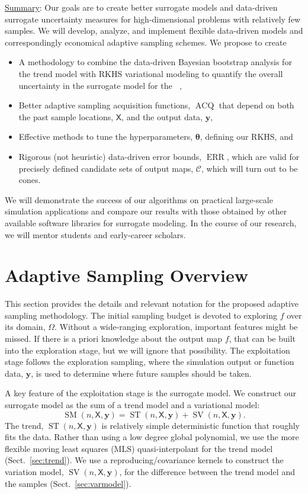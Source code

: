 \documentclass[11pt]{NSFamsart}
\newcommand{\Upara}[1]{\noindent\underline{\upshape #1}:}
\DeclareMathOperator{\QOI}{QOI} %
\DeclareMathOperator{\APP}{\widehat{\QOI}}
\DeclareMathOperator{\SURR}{SM} %
\DeclareMathOperator{\STREND}{ST} %
\DeclareMathOperator{\SVAR}{SV} %
\DeclareMathOperator{\ERR}{ERR}
\DeclareMathOperator{\VAL}{ACQ}
\newcommand{\mX}{\mathsf{X}}
\newcommand{\by}{{\boldsymbol{y}}}
\newcommand{\btheta}{{\boldsymbol{\theta}}}
\newcommand{\calc}{{\mathcal{C}}}
\begin{document}
\Upara{Summary} 
Our goals are to create better surrogate models and data-driven surrogate uncertainty measures for high-dimensional problems with relatively few samples. We will develop, analyze, and implement flexible data-driven models and correspondingly economical adaptive sampling schemes. We propose to create
\begin{itemize}
\item A methodology to combine the data-driven Bayesian bootstrap analysis for the trend model with RKHS variational modeling to quantify the overall uncertainty in the surrogate model for the $\APP$,
\item Better adaptive sampling acquisition functions, $\VAL$ that depend on both the past sample locations, $\mX$, and the output data, $\by$, 
\item Effective methods to tune the hyperparameters, $\btheta$, defining our RKHS, and
\item Rigorous (not heuristic) data-driven error bounds, $\ERR$, which are valid for precisely defined candidate sets of output maps, $\calc$, which will turn out to be cones.
\end{itemize}
We will demonstrate the success of our algorithms on practical large-scale simulation applications and compare our results with those obtained by other available software libraries for surrogate modeling. In the course of our research, we will mentor students and early-career scholars. 

\section{Adaptive Sampling Overview} \label{sec:overview}
This section provides the details and relevant notation for the proposed adaptive sampling methodology. The initial sampling budget is devoted to exploring $f$ over its domain, $\Omega$. Without a wide-ranging exploration, important features might be missed. If there is a priori knowledge about the output map $f$, that can be built into the exploration stage, but we will ignore that possibility. The exploitation stage follows the exploration sampling, where the simulation output or function data, $\by$, is used to determine where future samples should be taken.

A key feature of the exploitation stage is the surrogate model. We construct our surrogate model as the sum of a trend model and a variational model: 
\begin{equation*}
\SURR(n,\mX,\by) = \STREND(n,\mX,\by) + \SVAR(n,\mX,\by). 
\end{equation*} 
The trend, $\STREND(n,\mX,\by)$ is relatively simple deterministic function that roughly fits the data. Rather than using a low degree global polynomial, we use the more flexible moving least squares (MLS) quasi-interpolant for the trend model (Sect.\ \ref{sec:trend}). We use a reproducing/covariance kernels to construct the variation model, $\SVAR(n,\mX,\by)$, for the difference between the trend model and the samples (Sect.\ \ref{sec:varmodel}). 
\end{document}
